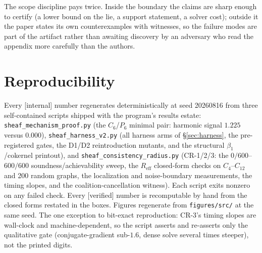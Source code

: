 \documentclass[11pt,a4paper]{article}
\begin{document}
The scope discipline pays twice. Inside the boundary the claims are sharp enough to certify (a lower bound on the lie, a
support statement, a solver cost); outside it the paper states its own counterexamples with witnesses, so the failure
modes are part of the artifact rather than awaiting discovery by an adversary who read the appendix more carefully than
the authors.

\section*{Reproducibility}

Every [internal] number regenerates deterministically at seed 20260816 from three self-contained scripts shipped with the
program's results estate: \texttt{sheaf\_mechanism\_proof.py} (the $C_6$/$P_6$ minimal pair: harmonic signal $1.225$
versus $0.000$), \texttt{sheaf\_harness\_v2.py} (all harness arms of \S\ref{sec:harness}, the pre-registered gates, the
D1/D2 reintroduction mutants, and the structural $\beta_1$/cokernel printout), and
\texttt{sheaf\_consistency\_radius.py} (CR-1/2/3: the $0/600$--$600/600$ soundness/achievability sweep, the
$R_{\mathrm{eff}}$ closed-form checks on $C_4$--$C_{12}$ and 200 random graphs, the localization and noise-boundary
measurements, the timing slopes, and the coalition-cancellation witness). Each script exits nonzero on any failed check.
Every [verified] number is recomputable by hand from the closed forms restated in the boxes. Figures regenerate from
\texttt{figures/src/} at the same seed. The one exception to bit-exact reproduction: CR-3's timing slopes are wall-clock
and machine-dependent, so the script asserts and re-asserts only the qualitative gate (conjugate-gradient sub-$1.6$,
dense solve several times steeper), not the printed digits.
\end{document}
